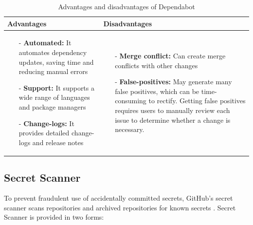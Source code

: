 \begin{table}[H]
\centering
\begin{tabular}{|>{\raggedright\arraybackslash}p{6cm}|>{\raggedright\arraybackslash}p{6cm}|}
\hline
\textbf{Advantages} & \textbf{Disadvantages} \\
\hline
\begin{itemize}
\item [-]\textbf{Automated:} It automates dependency updates, saving time and reducing manual errors 
\vspace{5pt}
\item [-] \textbf{Support:} It supports a wide range of languages and package managers 
\vspace{5pt}
\item [-]\textbf{Change-logs:} It provides detailed change-logs and release notes 
\end{itemize}
&
\begin{itemize}
\item [-] \textbf{Merge conflict:} Can create merge conflicts with other changes
\vspace{5pt}
\item [-] \textbf{False-positives:} May generate many false positives, which can be time-consuming to rectify. Getting false positives requires users to manually review each issue to determine whether a change is necessary. 

\end{itemize}
\\
\hline
\end{tabular}
\caption{Advantages and disadvantages of Dependabot}
\label{tab:dependabot}
\end{table}




\subsection{Secret Scanner}
To prevent fraudulent use of accidentally committed secrets, GitHub's secret scanner scans repositories and archived repositories for known secrets \cite{GithubSecretScanning}. Secret Scanner is provided in two forms:  

